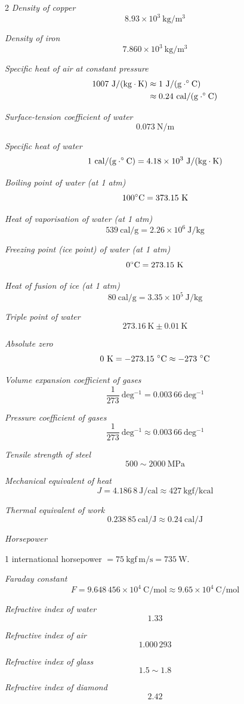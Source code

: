 \begin{multicols}{2}
\textit{Density of copper}
\[
8.93\times10^{3}\ \mathrm{kg/m^3}
\]

\textit{Density of iron}
\[
7.860\times10^{3}\ \mathrm{kg/m^3}
\]

\textit{Specific heat of air at constant pressure}
\[
\begin{aligned}
1007\ \mathrm{J/(kg\cdot K)}&\approx 1\ \mathrm{J/(g\cdot^{\circ} C)}\\
&\approx 0.24\ \mathrm{cal/(g\cdot^{\circ} C)}
\end{aligned}
\]

\textit{Surface-tension coefficient of water}
\[
0.073\ \mathrm{N/m}
\]

\textit{Specific heat of water}
\[
1\ \mathrm{cal/(g\cdot\degree C)}=4.18\times10^{3}\ \mathrm{J/(kg\cdot K)}
\]

\textit{Boiling point of water (at 1 atm)}
\[
100\degree\mathrm{C}=373.15\ \mathrm{K}
\]

\textit{Heat of vaporisation of water (at 1 atm)}
\[
539\ \mathrm{cal/g}=2.26\times10^{6}\ \mathrm{J/kg}
\]

\textit{Freezing point (ice point) of water (at 1 atm)}
\[
0\degree\mathrm{C}=273.15\ \mathrm{K}
\]

\textit{Heat of fusion of ice (at 1 atm)}
\[
80\ \mathrm{cal/g}=3.35\times10^{5}\ \mathrm{J/kg}
\]

\textit{Triple point of water}
\[
273.16\ \mathrm{K}\pm0.01\ \mathrm{K}
\]

\textit{Absolute zero}
\[
0\ \mathrm{K}=-273.15\ \degree\mathrm{C}\approx-273\ \degree\mathrm{C}
\]

\textit{Volume expansion coefficient of gases}
\[
\frac{1}{273}\ \mathrm{deg^{-1}}=0.003\,66\ \mathrm{deg^{-1}}
\]

\textit{Pressure coefficient of gases}
\[
\frac{1}{273}\ \mathrm{deg^{-1}}\approx 0.003\,66\ \mathrm{deg^{-1}}
\]

\textit{Tensile strength of steel}
\[
500\sim 2000\ \mathrm{MPa}
\]

\textit{Mechanical equivalent of heat}
\[
J=4.186\,8\ \mathrm{J/cal}\approx 427\ \mathrm{kgf/kcal}
\]

\textit{Thermal equivalent of work}
\[
0.238\,85\ \mathrm{cal/J}\approx 0.24\ \mathrm{cal/J}
\]

\textit{Horsepower}

1 international horsepower $=75\ \mathrm{kgf\,m/s}=735\ \mathrm{W}$.

\textit{Faraday constant}
\[
F=9.648\,456\times10^{4}\ \mathrm{C/mol}\approx 9.65\times10^{4}\ \mathrm{C/mol}
\]

\textit{Refractive index of water}
\[
1.33
\]

\textit{Refractive index of air}
\[
1.000\,293
\]

\textit{Refractive index of glass}
\[
1.5\sim1.8
\]

\textit{Refractive index of diamond}
\[
2.42
\]

\end{multicols}

